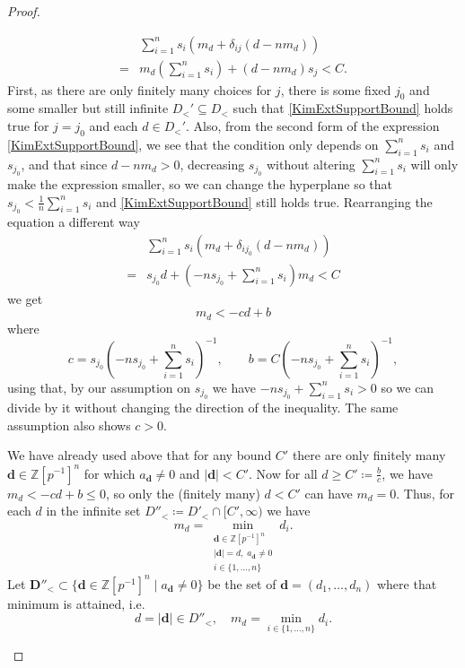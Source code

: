 \documentclass[10pt,a4paper]{amsart}
\newcommand{\ZZip}{\ZZ[p^{-1}]}
\newcommand{\ZZ}{\mathbb{Z}}
\begin{document}
\begin{proof}
\begin{itemize}
        \begin{align*}
            &\sum_{i=1}^n s_i\left(m_d + \delta_{ij}(d-nm_d)\right)\\
        =&m_d\left(\sum_{i=1}^n s_i \right)+ (d-nm_d)s_{j}
        <C\tag{*}\label{KimExtSupportBound}.
        \end{align*}
        First, as there are only finitely many choices for \(j\), there is some fixed \(j_0\) and some smaller but still infinite \(D_{<}'\subseteq D_{<}\) such that \eqref{KimExtSupportBound} holds true for \(j=j_0\) and each \(d\in D_{<}'\). Also, from the second form of the expression \eqref{KimExtSupportBound}, we see that the condition only depends on \(\sum_{i=1}^n s_i\) and \(s_{j_0}\), and that since \(d-nm_d>0\), decreasing \(s_{j_0}\) without altering \(\sum_{i=1}^n s_i\) will only make the expression smaller, so we can change the hyperplane so that \(s_{j_0}<\frac 1n\sum_{i=1}^n s_i\) and \eqref{KimExtSupportBound} still holds true.
        Rearranging the equation a different way
        \begin{align*}&\sum_{i=1}^n s_i\left(m_d + \delta_{ij_0}(d-nm_d)\right)\\=
        &s_{j_0}d+
        \left(-ns_{j_0}+\sum_{i=1}^ns_i\right)m_d<C
        \end{align*}
        we get
        \[m_d < -cd+b\]
        where
        \[c=s_{j_0}\left(-ns_{j_0}+\sum_{i=1}^ns_i\right)^{-1}, \qquad b=C\left(-ns_{j_0}+\sum_{i=1}^ns_i\right)^{-1},\]
        using that, by our assumption on \(s_{j_0}\) we have \(-ns_{j_0}+\sum_{i=1}^ns_i>0\) so we can divide by it without changing the direction of the inequality. The same assumption also shows \(c>0\). \par
        We have already used above that for any bound \(C'\) there are only finitely many \(\mathbf d\in \ZZip^n\) for which \(a_{\mathbf d} \neq 0\) and \(|\mathbf d|<C'\). Now for all \(d\geq C'\coloneqq\frac{b}{c}\), we have \(m_d < -cd+b \leq 0\), so only the (finitely many) \(d<C'\) can have \(m_d=0\). Thus, for each \(d\) in the infinite set \(D''_<\coloneqq D'_<\cap [C',\infty)\) we have 
        \[m_d=\min_{\substack{\mathbf d\in \ZZip^n\\|\mathbf d|=d,\;a_{\mathbf d}\neq 0\\i\in\{1,\dots,n\}}} d_i.\]
        Let \(\mathbf D''_< \subset \{\mathbf{d}\in\ZZip^n\mid a_\mathbf{d} \neq 0\}\) be the set of \(\mathbf d=(d_1,\dots, d_n)\) where that minimum is attained, i.e. 
        \[d=|\mathbf d|\in D''_<, \quad m_d = \min_{i\in \{1,\dots, n\}} d_i.\]

\end{itemize}
\end{proof}
\end{document}
